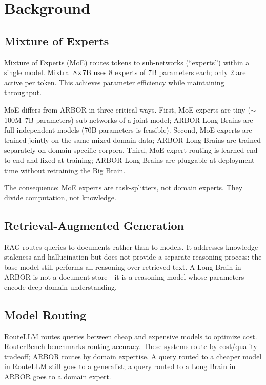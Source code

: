 \documentclass[12pt]{article}
\begin{document}
\section{Background}

\subsection{Mixture of Experts}

Mixture of Experts (MoE) \cite{jacobs1991, shazeer2017} routes tokens to sub-networks (``experts'') within a single model. Mixtral 8$\times$7B \cite{jiang2024} uses 8 experts of 7B parameters each; only 2 are active per token. This achieves parameter efficiency while maintaining throughput.

MoE differs from ARBOR in three critical ways. First, MoE experts are tiny ($\sim$100M--7B parameters) sub-networks of a joint model; ARBOR Long Brains are full independent models (70B parameters is feasible). Second, MoE experts are trained jointly on the same mixed-domain data; ARBOR Long Brains are trained separately on domain-specific corpora. Third, MoE expert routing is learned end-to-end and fixed at training; ARBOR Long Brains are pluggable at deployment time without retraining the Big Brain.

The consequence: MoE experts are task-splitters, not domain experts. They divide computation, not knowledge.

\subsection{Retrieval-Augmented Generation}

RAG \cite{lewis2020} routes queries to documents rather than to models. It addresses knowledge staleness and hallucination but does not provide a separate reasoning process: the base model still performs all reasoning over retrieved text. A Long Brain in ARBOR is not a document store---it is a reasoning model whose parameters encode deep domain understanding.

\subsection{Model Routing}

RouteLLM \cite{ong2024} routes queries between cheap and expensive models to optimize cost. RouterBench \cite{hu2024} benchmarks routing accuracy. These systems route by cost/quality tradeoff; ARBOR routes by domain expertise. A query routed to a cheaper model in RouteLLM still goes to a generalist; a query routed to a Long Brain in ARBOR goes to a domain expert.
\end{document}
